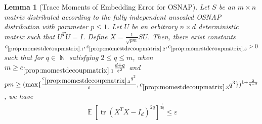\documentclass[11pt]{amsart}
\numberwithin{equation}{section}
\numberwithin{equation}{section}
\DeclareMathOperator{\E}{\mathbb{E}}
\DeclareMathOperator{\N}{\mathbb{N}}
\DeclareMathOperator*{\tr}{tr}
\newtheorem{lemma}[theorem]{Lemma}
\theoremstyle{remark}
\theoremstyle{definition}
\begin{document}
\begin{lemma}[Trace Moments of Embedding Error for OSNAP] \label{prop:momestdecoupmatrix}
Let $S$ be an $m \times n$ matrix distributed according to the fully independent unscaled OSNAP distribution with parameter $p \le 1$. Let $U$ be an arbitrary $n \times d$ deterministic matrix such that $U^TU=I$. Define $X = \frac{1}{\sqrt{pm}}SU$.  Then, there exist constants $c_{\ref*{prop:momestdecoupmatrix}.1}, c_{\ref*{prop:momestdecoupmatrix}.2}, c_{\ref*{prop:momestdecoupmatrix}.3} > 0$ such that for $q \in \N$ satisfying $2 \le q \le m$, when $m \geq c_{\ref*{prop:momestdecoupmatrix}.1} \frac{d+q}{\varepsilon^2}$ and $ pm \ge (\max\{\frac{c_{\ref*{prop:momestdecoupmatrix}.2} q^{2}}{\varepsilon}, c_{\ref*{prop:momestdecoupmatrix}.3} q^3\})^{1+\frac{2}{q-2}} $, we have
\begin{align*}
    \E[\tr(X^TX - I_d)^{2q}]^\frac{1}{2q} \leq  \varepsilon
\end{align*} 

\end{lemma}
\end{document}
